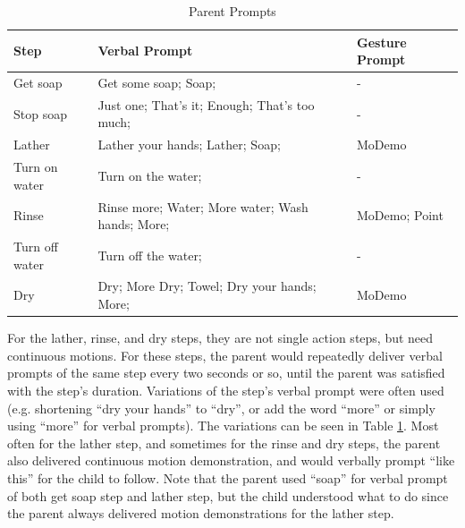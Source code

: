 \begin{table}[H]
	\centering
	\begin{tabular}{ | l | l | l | }
		\hline
		\textbf{Step}	&	\textbf{Verbal Prompt} & \textbf{Gesture Prompt}	\\	\hline	\hline
		
		Get soap	&	Get some soap; Soap;	&	- 	\\	\hline
		Stop soap	&	Just one; That's it; Enough; That's too much;	&	-	\\ \hline
		Lather	&	Lather your hands; Lather; Soap;	& MoDemo	\\	\hline
		Turn on water	&	Turn on the water;	&	-	\\	\hline
		Rinse	&	Rinse more; Water; More water; Wash hands; More;	&	MoDemo; Point	\\	\hline
		Turn off water	&	Turn off the water;	&	-	\\	\hline
		Dry	&	Dry; More Dry; Towel; Dry your hands; More;	&	MoDemo	\\	\hline
		
	\end{tabular}
	\caption{Parent Prompts}
	\label{tab:ParentPrompts}
\end{table}

For the lather, rinse, and dry steps, they are not single action steps, but need continuous motions.  For these steps, the parent would repeatedly deliver verbal prompts of the same step every two seconds or so, until the parent was satisfied with the step's duration.  Variations of the step's verbal prompt were often used (e.g. shortening ``dry your hands'' to ``dry'', or add the word ``more'' or simply using ``more'' for verbal prompts).  The variations can be seen in Table \ref{tab:ParentPrompts}.  Most often for the lather step, and sometimes for the rinse and dry steps, the parent also delivered continuous motion demonstration, and would verbally prompt ``like this'' for the child to follow.  Note that the parent used ``soap'' for verbal prompt of both get soap step and lather step, but the child understood what to do since the parent always delivered motion demonstrations for the lather step.

